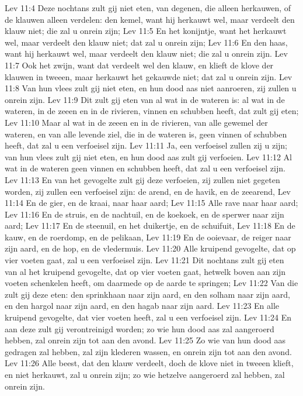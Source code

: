 Lev 11:4  Deze nochtans zult gij niet eten, van degenen, die alleen herkauwen, of de klauwen alleen verdelen: den kemel, want hij herkauwt wel, maar verdeelt den klauw niet; die zal u onrein zijn;
Lev 11:5  En het konijntje, want het herkauwt wel, maar verdeelt den klauw niet; dat zal u onrein zijn;
Lev 11:6  En den haas, want hij herkauwt wel, maar verdeelt den klauw niet; die zal u onrein zijn.
Lev 11:7  Ook het zwijn, want dat verdeelt wel den klauw, en klieft de klove der klauwen in tweeen, maar herkauwt het gekauwde niet; dat zal u onrein zijn.
Lev 11:8  Van hun vlees zult gij niet eten, en hun dood aas niet aanroeren, zij zullen u onrein zijn.
Lev 11:9  Dit zult gij eten van al wat in de wateren is: al wat in de wateren, in de zeeen en in de rivieren, vinnen en schubben heeft, dat zult gij eten;
Lev 11:10  Maar al wat in de zeeen en in de rivieren, van alle gewemel der wateren, en van alle levende ziel, die in de wateren is, geen vinnen of schubben heeft, dat zal u een verfoeisel zijn.
Lev 11:11  Ja, een verfoeisel zullen zij u zijn; van hun vlees zult gij niet eten, en hun dood aas zult gij verfoeien.
Lev 11:12  Al wat in de wateren geen vinnen en schubben heeft, dat zal u een verfoeisel zijn.
Lev 11:13  En van het gevogelte zult gij deze verfoeien, zij zullen niet gegeten worden, zij zullen een verfoeisel zijn: de arend, en de havik, en de zeearend,
Lev 11:14  En de gier, en de kraai, naar haar aard;
Lev 11:15  Alle rave naar haar aard;
Lev 11:16  En de struis, en de nachtuil, en de koekoek, en de sperwer naar zijn aard;
Lev 11:17  En de steenuil, en het duikertje, en de schuifuit,
Lev 11:18  En de kauw, en de roerdomp, en de pelikaan,
Lev 11:19  En de ooievaar, de reiger naar zijn aard, en de hop, en de vledermuis.
Lev 11:20  Alle kruipend gevogelte, dat op vier voeten gaat, zal u een verfoeisel zijn.
Lev 11:21  Dit nochtans zult gij eten van al het kruipend gevogelte, dat op vier voeten gaat, hetwelk boven aan zijn voeten schenkelen heeft, om daarmede op de aarde te springen;
Lev 11:22  Van die zult gij deze eten: den sprinkhaan naar zijn aard, en den solham naar zijn aard, en den hargol naar zijn aard, en den hagab naar zijn aard.
Lev 11:23  En alle kruipend gevogelte, dat vier voeten heeft, zal u een verfoeisel zijn.
Lev 11:24  En aan deze zult gij verontreinigd worden; zo wie hun dood aas zal aangeroerd hebben, zal onrein zijn tot aan den avond.
Lev 11:25  Zo wie van hun dood aas gedragen zal hebben, zal zijn klederen wassen, en onrein zijn tot aan den avond.
Lev 11:26  Alle beest, dat den klauw verdeelt, doch de klove niet in tweeen klieft, en niet herkauwt, zal u onrein zijn; zo wie hetzelve aangeroerd zal hebben, zal onrein zijn.
